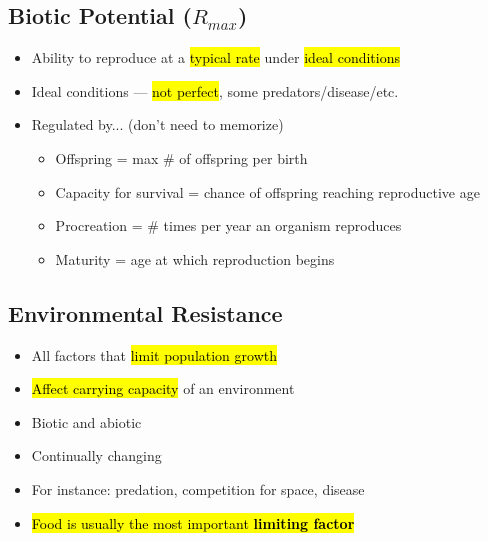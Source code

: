 \documentclass[a4paper,12pt]{article}
\begin{document}
\subsection{Biotic Potential ($R_{max}$)}
\begin{itemize}
    \item{Ability to reproduce at a \hl{typical rate} under \hl{ideal conditions}}
    \item{Ideal conditions --- \hl{not perfect}, some predators/disease/etc.}
    \item{
            Regulated by... (don't need to memorize)
            \begin{itemize}
                \item{Offspring = max \# of offspring per birth}
                \item{Capacity for survival = chance of offspring reaching reproductive age}
                \item{Procreation = \# times per year an organism reproduces}
                \item{Maturity = age at which reproduction begins}
            \end{itemize}
        }
\end{itemize}

\subsection{Environmental Resistance}
\begin{itemize}
    \item{All factors that \hl{limit population growth}}
    \item{\hl{Affect carrying capacity} of an environment}
    \item{Biotic and abiotic}
    \item{Continually changing}
    \item{For instance: predation, competition for space, disease}
    \item{\hl{Food is usually the most important \textbf{limiting factor}}}
\end{itemize}
\end{document}
